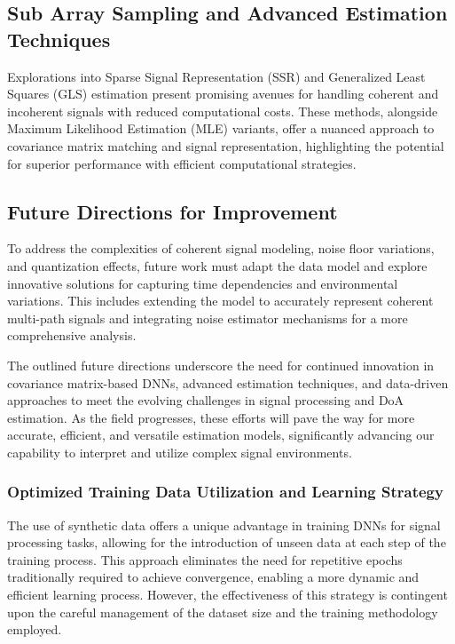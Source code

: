 \subsection{Sub Array Sampling and Advanced Estimation Techniques}

Explorations into Sparse Signal Representation (SSR) and Generalized Least Squares (GLS) estimation present promising
avenues for handling coherent and incoherent signals with reduced computational costs. These methods, alongside Maximum
Likelihood Estimation (MLE) variants, offer a nuanced approach to covariance matrix matching and signal representation,
highlighting the potential for superior performance with efficient computational strategies.

\subsection{Future Directions for Improvement}

To address the complexities of coherent signal modeling, noise floor variations, and quantization effects, future work
must adapt the data model and explore innovative solutions for capturing time dependencies and environmental variations.
This includes extending the model to accurately represent coherent multi-path signals and integrating noise estimator
mechanisms for a more comprehensive analysis.

The outlined future directions underscore the need for continued innovation in covariance matrix-based DNNs, advanced
estimation techniques, and data-driven approaches to meet the evolving challenges in signal processing and DoA estimation.
As the field progresses, these efforts will pave the way for more accurate, efficient, and versatile estimation models,
significantly advancing our capability to interpret and utilize complex signal environments.



\subsubsection{Optimized Training Data Utilization and Learning Strategy}
\label{subsub:optimized_training_data_utilization}

The use of synthetic data offers a unique advantage in training DNNs for signal processing tasks, allowing for the introduction of unseen data at each step of the training process. This approach eliminates the need for repetitive epochs traditionally required to achieve convergence, enabling a more dynamic and efficient learning process. However, the effectiveness of this strategy is contingent upon the careful management of the dataset size and the training methodology employed.

